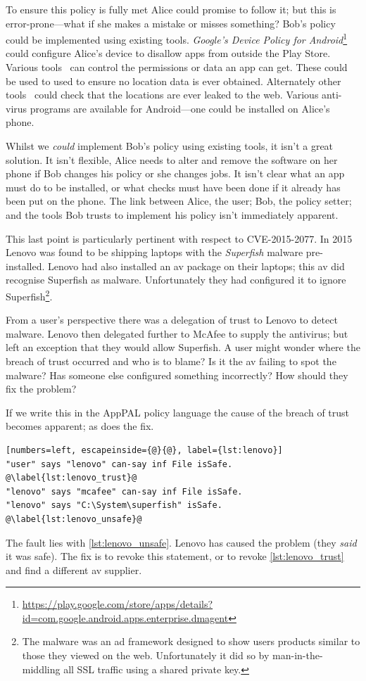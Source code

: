 \documentclass[a4paper]{scrartcl}
\begin{document}
To ensure this policy is fully met Alice could promise to follow it; but this is error-prone---what if she makes a mistake or misses something?
Bob's policy could be implemented using existing tools.
\emph{Google's Device Policy for Android}\footnote{\url{https://play.google.com/store/apps/details?id=com.google.android.apps.enterprise.dmagent}}
  could configure Alice's device to disallow apps from outside the Play Store.
Various tools~\citep{Backes:2012vm,Jeon:2012ki,Hornyack:2011wq} can control the permissions or data an app can get.
These could be used to used to ensure no location data is ever obtained.
Alternately other tools~\citep{Enck:2009ko,Fritz:2013vi,Gordon:2015et} could check that the locations are ever leaked to the web.
Various anti-virus programs are available for Android---one could be installed on Alice's phone.

Whilst we \emph{could} implement Bob's policy using existing tools, it isn't a great solution.
It isn't flexible, Alice needs to alter and remove the software on her phone if Bob changes his policy or she changes jobs.
It isn't clear what an app must do to be installed, or what checks must have been done if it already has been put on the phone.
The link between Alice, the user; Bob, the policy setter; and the tools Bob trusts to implement his policy isn't immediately apparent.

This last point is particularly pertinent with respect to \textsc{CVE-2015-2077}.
In 2015 Lenovo was found to be shipping laptops with the \emph{Superfish} malware pre-installed.
Lenovo had also installed an \ac{av} package on their laptops; this \ac{av} did recognise Superfish as malware.
Unfortunately they had configured it to ignore Superfish\footnote{The malware was an ad framework designed to show users products similar to those they viewed on the web.  Unfortunately it did so by man-in-the-middling all SSL traffic using a shared private key.}.

From a user's perspective there was a delegation of trust to Lenovo to detect malware.
Lenovo then delegated further to McAfee to supply the antivirus; but left an exception that they would allow Superfish.
A user might wonder where the breach of trust occurred and who is to blame?  
Is it the \ac{av} failing to spot the malware? 
Has someone else configured something incorrectly?
How should they fix the problem?

If we write this in the AppPAL policy language the cause of the breach of trust becomes apparent; as does the fix.
\begin{lstlisting}[numbers=left, escapeinside={@}{@}, label={lst:lenovo}]
"user" says "lenovo" can-say inf File isSafe. @\label{lst:lenovo_trust}@
"lenovo" says "mcafee" can-say inf File isSafe.
"lenovo" says "C:\System\superfish" isSafe. @\label{lst:lenovo_unsafe}@
\end{lstlisting}
The fault lies with \autoref{lst:lenovo_unsafe}.  
Lenovo has caused the problem (they \emph{said} it was safe).
The fix is to revoke this statement, or to revoke \autoref{lst:lenovo_trust} and find a different \ac{av} supplier.
\end{document}
